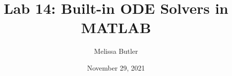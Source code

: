 \newcommand{\course}{MATH 3341}
\title{Lab 14: Built-in ODE Solvers in MATLAB}
\author{Melissa Butler}
\date{November 29, 2021}
